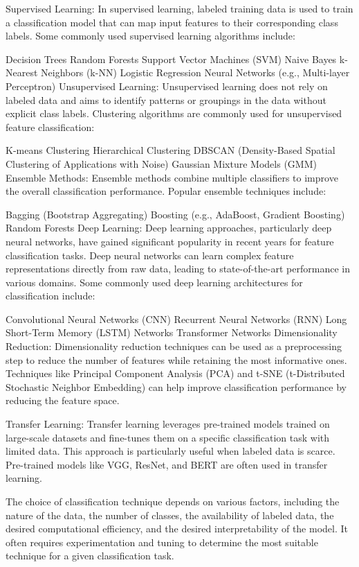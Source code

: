 \documentclass[10pt,aspectratio=169,dvipsnames]{beamer} %
\begin{document}
{		Supervised Learning: In supervised learning, labeled training data is used to train a classification model that can map input features to their corresponding class labels. Some commonly used supervised learning algorithms include:
		
		Decision Trees
		Random Forests
		Support Vector Machines (SVM)
		Naive Bayes
		k-Nearest Neighbors (k-NN)
		Logistic Regression
		Neural Networks (e.g., Multi-layer Perceptron)
		Unsupervised Learning: Unsupervised learning does not rely on labeled data and aims to identify patterns or groupings in the data without explicit class labels. Clustering algorithms are commonly used for unsupervised feature classification:
		
		K-means Clustering
		Hierarchical Clustering
		DBSCAN (Density-Based Spatial Clustering of Applications with Noise)
		Gaussian Mixture Models (GMM)
		Ensemble Methods: Ensemble methods combine multiple classifiers to improve the overall classification performance. Popular ensemble techniques include:
		
		Bagging (Bootstrap Aggregating)
		Boosting (e.g., AdaBoost, Gradient Boosting)
		Random Forests
		Deep Learning: Deep learning approaches, particularly deep neural networks, have gained significant popularity in recent years for feature classification tasks. Deep neural networks can learn complex feature representations directly from raw data, leading to state-of-the-art performance in various domains. Some commonly used deep learning architectures for classification include:
		
		Convolutional Neural Networks (CNN)
		Recurrent Neural Networks (RNN)
		Long Short-Term Memory (LSTM) Networks
		Transformer Networks
		Dimensionality Reduction: Dimensionality reduction techniques can be used as a preprocessing step to reduce the number of features while retaining the most informative ones. Techniques like Principal Component Analysis (PCA) and t-SNE (t-Distributed Stochastic Neighbor Embedding) can help improve classification performance by reducing the feature space.
		
		Transfer Learning: Transfer learning leverages pre-trained models trained on large-scale datasets and fine-tunes them on a specific classification task with limited data. This approach is particularly useful when labeled data is scarce. Pre-trained models like VGG, ResNet, and BERT are often used in transfer learning.
		
		The choice of classification technique depends on various factors, including the nature of the data, the number of classes, the availability of labeled data, the desired computational efficiency, and the desired interpretability of the model. It often requires experimentation and tuning to determine the most suitable technique for a given classification task.
	}
\end{document}
